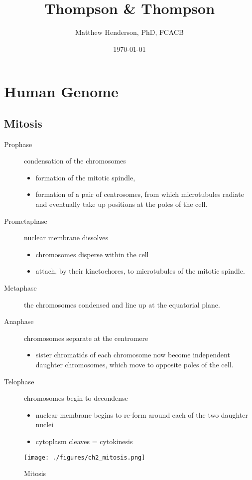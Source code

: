 \documentclass[12pt]{scrartcl}
\author{Matthew Henderson, PhD, FCACB}
\date{\today}
\title{Thompson \& Thompson}
\begin{document}
\maketitle
\setcounter{tocdepth}{1}
\tableofcontents


\section{Human Genome}
\label{sec:org233a3f9}
\subsection{Mitosis}
\label{sec:orgc1b69e4}
\begin{description}
\item[{Prophase}] condensation of the chromosomes
\begin{itemize}
\item formation of the mitotic spindle,
\item formation of a pair of centrosomes, from which microtubules
radiate and eventually take up positions at the poles of the cell.
\end{itemize}
\item[{Prometaphase}] nuclear membrane dissolves
\begin{itemize}
\item chromosomes disperse within the cell
\item attach, by their kinetochores, to microtubules of the mitotic
spindle.
\end{itemize}
\item[{Metaphase}] the chromosomes condensed and line up at the equatorial
plane.
\item[{Anaphase}] chromosomes separate at the centromere
\begin{itemize}
\item sister chromatids of each chromosome now become independent
daughter chromosomes, which move to opposite poles of the cell.
\end{itemize}
\item[{Telophase}] chromosomes begin to decondense
\begin{itemize}
\item nuclear membrane begins to re-form around each of the two daughter
nuclei
\item cytoplasm cleaves = cytokinesis
\end{itemize}
\end{description}

\begin{figure}[htbp]
\centering
\texttt{[image: ./figures/ch2\_mitosis.png]}
\caption{\label{fig:org49b432b}Mitosis}
\end{figure}
\end{document}
